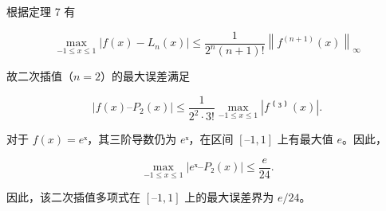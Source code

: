 \documentclass[11pt]{article}
\begin{document}
根据定理 7 有

\[
\max\limits_{-1\le x\le 1} |f(x) - L_n(x)| \le \frac{1}{2^n(n+1)!}\left\lVert f^{(n+1)}(x)\right\rVert _\infty 
\]

故二次插值（\(n=2\)）的最大误差满足

\[
|f(x) – P_2(x)| \le \frac{1}{2^2\cdot 3!} \max\limits_{-1\le x\le 1} |f⁽³⁾(x)|.
\]

对于 \(f(x)=eˣ\)，其三阶导数仍为 \(eˣ\)，在区间 \([–1,1]\) 上有最大值
\(e\)。因此，

\[
\max\limits_{-1\le x\le 1} |eˣ – P₂(x)| \le \frac{e}{24}.
\]

因此，该二次插值多项式在 \([–1,1]\) 上的最大误差界为 \(e/24\)。


    
    
    
\end{document}
